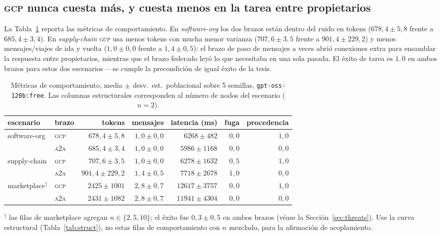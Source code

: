 \documentclass[10pt,twocolumn,letterpaper]{article}
\newcommand{\gcp}{\textsc{gcp}}
\newcommand{\ata}{\textsc{a2a}}
\begin{document}
\subsection{\gcp{} nunca cuesta más, y cuesta menos en la tarea entre
propietarios}
La Tabla~\ref{tab:behav} reporta las métricas de comportamiento. En
\emph{software-org} los dos brazos están dentro del ruido en tokens
($678{,}4{\pm}5{,}8$ frente a $685{,}4{\pm}3{,}4$). En \emph{supply-chain} \gcp{}
usa menos tokens con mucha menor varianza ($707{,}6{\pm}3{,}5$ frente a
$901{,}4{\pm}229{,}2$) y menos mensajes/viajes de ida y vuelta ($1{,}0{\pm}0{,}0$
frente a $1{,}4{\pm}0{,}5$): el brazo de paso de mensajes a veces abrió conexiones
extra para ensamblar la respuesta entre propietarios, mientras que el brazo federado
leyó lo que necesitaba en una sola pasada. El éxito de tarea es $1{,}0$ en ambos
brazos para estos dos escenarios ---se cumple la precondición de igual éxito de la
tesis.

\begin{table}[t]
\centering
\caption{Métricas de comportamiento, media $\pm$ desv.\ est.\ poblacional sobre 5
semillas, \texttt{gpt-oss-120b:free}. Las columnas estructurales corresponden al
número de nodos del escenario ($n{=}2$).}
\label{tab:behav}
\setlength{\tabcolsep}{4pt}
\begin{tabular}{llrrrrr}
\toprule
escenario & brazo & tokens & mensajes & latencia (ms) & fuga & procedencia \\
\midrule
\multirow{2}{*}{software-org}
 & \gcp{} & $678{,}4{\pm}5{,}8$  & $1{,}0{\pm}0{,}0$ & $6268{\pm}482$  & $0{,}0$ & $1{,}0$ \\
 & \ata{} & $685{,}4{\pm}3{,}4$  & $1{,}0{\pm}0{,}0$ & $5986{\pm}1168$ & $0{,}0$ & $0{,}0$ \\
\midrule
\multirow{2}{*}{supply-chain}
 & \gcp{} & $707{,}6{\pm}3{,}5$   & $1{,}0{\pm}0{,}0$ & $6278{\pm}1632$ & $0{,}5$ & $1{,}0$ \\
 & \ata{} & $901{,}4{\pm}229{,}2$ & $1{,}4{\pm}0{,}5$ & $7718{\pm}2678$ & $1{,}0$ & $0{,}0$ \\
\midrule
\multirow{2}{*}{marketplace$^\dagger$}
 & \gcp{} & $2425{\pm}1001$ & $2{,}8{\pm}0{,}7$ & $12617{\pm}3757$ & $0{,}0$ & $1{,}0$ \\
 & \ata{} & $2431{\pm}1082$ & $2{,}8{\pm}0{,}7$ & $11941{\pm}4304$ & $0{,}0$ & $0{,}0$ \\
\bottomrule
\end{tabular}
\par\smallskip
\footnotesize $^\dagger$ las filas de marketplace agregan $n\in\{2,5,10\}$; el
éxito fue $0{,}3{\pm}0{,}5$ en ambos brazos (véase la
Sección~\ref{sec:threats}). Use la curva estructural (Tabla~\ref{tab:struct}), no
estas filas de comportamiento con $n$ mezclado, para la afirmación de
acoplamiento.
\end{table}
\end{document}
